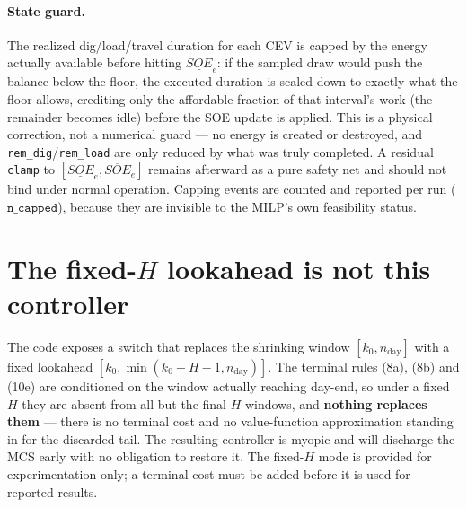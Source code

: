 \documentclass[11pt]{article}
\begin{document}
\paragraph{State guard.} The realized dig/load/travel duration for each CEV is capped by the
energy actually available before hitting $\underline{SOE}_e$: if the sampled draw would push the
balance below the floor, the executed duration is scaled down to exactly what the floor allows,
crediting only the affordable fraction of that interval's work (the remainder becomes idle) before
the SOE update is applied. This is a physical correction, not a numerical guard — no energy is
created or destroyed, and \texttt{rem\_dig}/\texttt{rem\_load} are only reduced by what was truly
completed. A residual \texttt{clamp} to $[\underline{SOE}_e,\overline{SOE}_e]$ remains afterward as
a pure safety net and should not bind under normal operation. Capping events are counted and
reported per run ($\texttt{n\_capped}$), because they are invisible to the MILP's own feasibility
status.

\section{The fixed-\texorpdfstring{$H$}{H} lookahead is not this controller}
\label{sec:fixedH}
The code exposes a switch that replaces the shrinking window $[k_0,n_{\text{day}}]$ with a fixed
lookahead $[k_0,\min(k_0+H-1,n_{\text{day}})]$. The terminal rules (8a), (8b) and (10e) are conditioned on the window actually reaching
day-end, so under a fixed $H$ they are absent from all but the final $H$ windows, and
\textbf{nothing replaces them} --- there is no terminal cost and no value-function approximation
standing in for the discarded tail. The resulting controller is myopic and will discharge the MCS
early with no obligation to restore it. The fixed-$H$ mode is provided for experimentation only;
a terminal cost must be added before it is used for reported results.
\end{document}
